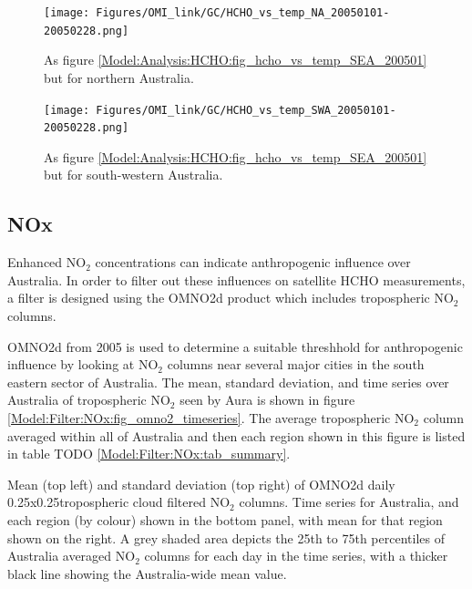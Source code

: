         \begin{figure}
          \texttt{[image: Figures/OMI\_link/GC/HCHO\_vs\_temp\_NA\_20050101-20050228.png]}
          \caption{%
            As figure \ref{Model:Analysis:HCHO:fig_hcho_vs_temp_SEA_200501} but for northern Australia.
            }
          \label{Model:Analysis:HCHO:fig_hcho_vs_temp_NA_200501}
        \end{figure}
          
        \begin{figure}
          \texttt{[image: Figures/OMI\_link/GC/HCHO\_vs\_temp\_SWA\_20050101-20050228.png]}
          \caption{%
            As figure \ref{Model:Analysis:HCHO:fig_hcho_vs_temp_SEA_200501} but for south-western Australia.
            }
          \label{Model:Analysis:HCHO:fig_hcho_vs_temp_SWA_200501}
        \end{figure}
  
  \subsection{NOx}
    \label{Model:Filter:NOx}
    
    Enhanced NO$_2$ concentrations can indicate anthropogenic influence over Australia.
    In order to filter out these influences on satellite HCHO measurements, a filter is designed using the OMNO2d product which includes tropospheric NO$_2$ columns.
    
    OMNO2d from 2005 is used to determine a suitable threshhold for anthropogenic influence by looking at NO$_2$ columns near several major cities in the south eastern sector of Australia.
    The mean, standard deviation, and time series over Australia of tropospheric NO$_2$ seen by Aura is shown in figure \ref{Model:Filter:NOx:fig_omno2_timeseries}.
    The average tropospheric NO$_2$ column averaged within all of Australia and then each region shown in this figure is listed in table TODO \ref{Model:Filter:NOx:tab_summary}.
    
    {Mean (top left) and standard deviation (top right) of OMNO2d daily 0.25x0.25\degr tropospheric cloud filtered NO$_2$ columns. Time series for Australia, and each region (by colour) shown in the bottom panel, with mean for that region shown on the right. A grey shaded area depicts the 25th to 75th percentiles of Australia averaged NO$_2$ columns for each day in the time series, with a thicker black line showing the Australia-wide mean value.}
    {\label{Model:Filter:NOx:fig_omno2_timeseries}}
    
